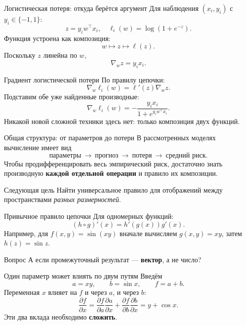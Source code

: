 \documentclass[aspectratio=169,10pt]{beamer}
\newcommand{\grad}{\nabla}
\begin{document}
\begin{frame}{Логистическая потеря: откуда берётся аргумент}
\small
Для наблюдения $(x_i,y_i)$ с $y_i\in\{-1,1\}$:
\[
 z=y_iw^\top x_i,
\quad \ell_i(w)=\log(1+e^{-z}).
\]
Функция устроена как композиция:
\[
 w\longmapsto z\longmapsto\ell(z).
\]
Поскольку $z$ линейна по $w$,
\[
\boxed{\grad_w z=y_ix_i.}
\]
\end{frame}

\begin{frame}{Градиент логистической потери}
\small
По правилу цепочки:
\[
\grad_w \ell_i(w)=\ell'(z)\grad_w z.
\]
Подставим обе уже найденные производные:
\[
\boxed{
\grad_w\ell_i(w)
=-\frac{y_ix_i}{1+e^{y_iw^\top x_i}}.
}
\]
Никакой новой сложной техники здесь нет: только композиция двух функций.
\end{frame}

\begin{frame}{Общая структура: от параметров до потери}
\small
В рассмотренных моделях вычисление имеет вид
\[
\boxed{\text{параметры}}
\ \longrightarrow\
\boxed{\text{прогноз}}
\ \longrightarrow\
\boxed{\text{потеря}}
\ \longrightarrow\
\boxed{\text{средний риск}}.
\]
Чтобы продифференцировать весь эмпирический риск, достаточно знать производную \textbf{каждой отдельной операции} и правило их композиции.
\begin{alertblock}{Следующая цель}
Найти универсальное правило для отображений между пространствами \emph{разных размерностей}.
\end{alertblock}
\end{frame}
\begin{frame}{Привычное правило цепочки}
\small
Для одномерных функций:
\[
\boxed{(h\circ g)'(x)=h'(g(x))g'(x).}
\]
Например, для $f(x,y)=\sin(xy)$ вначале вычисляем $g(x,y)=xy$, затем $h(z)=\sin z$.

\begin{block}{Вопрос}
А если промежуточный результат — \textbf{вектор}, а не число?
\end{block}
\end{frame}

\begin{frame}{Один параметр может влиять по двум путям}
\small
Введём
\[
 a=xy,\qquad b=\sin x,\qquad f=a+b.
\]
Переменная $x$ влияет на $f$ и через $a$, и через $b$:
\[
\frac{\partial f}{\partial x}
=\frac{\partial f}{\partial a}\frac{\partial a}{\partial x}
+\frac{\partial f}{\partial b}\frac{\partial b}{\partial x}
=y+\cos x.
\]
Эти два вклада необходимо \textbf{сложить}.
\end{frame}
\end{document}
